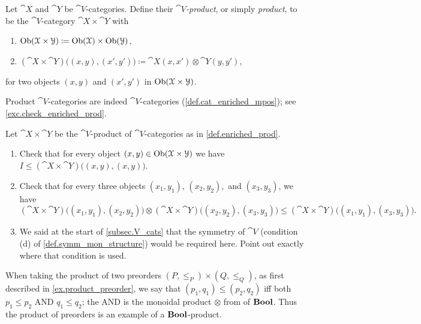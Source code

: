 \documentclass[7Sketches]{subfiles}
\begin{document}
\begin{definition}%
\label{def.enriched_prod}%
Let $\cat{X}$ and $\cat{Y}$ be $\cat{V}$-categories. Define their \emph{$\cat{V}$-product}, or simply \emph{product}, to be the $\cat{V}$-category $\cat{X}\times\cat{Y}$ with
\begin{enumerate}[label=(\roman*)]
	\item $\operatorname{Ob}(\mathcal{X}\times\mathcal{Y})\coloneqq\operatorname{Ob}(\mathcal{X})\times\operatorname{Ob}(\mathcal{Y})$,
	\item $(\cat{X}\times\cat{Y})\big((x,y),(x',y')\big)\coloneqq\cat{X}(x,x')\otimes\cat{Y}(y,y')$,
\end{enumerate}
for two objects $(x,y)$ and $(x',y')$ in $\operatorname{Ob}(\mathcal{X}\times\mathcal{Y})$. 
\end{definition}
Product $\cat{V}$-categories are indeed $\cat{V}$-categories
(\cref{def.cat_enriched_mpos}); see \cref{exc.check_enriched_prod}.

\begin{exercise}%
\label{exc.check_enriched_prod}
Let $\cat{X}\times\cat{Y}$ be the $\cat{V}$-product of $\cat{V}$-categories as in \cref{def.enriched_prod}.
\begin{enumerate}
	\item Check that for every object $(x,y)\in\operatorname{Ob}(\mathcal{X}\times\mathcal{Y})$ we
	have $I\leq(\cat{X}\times\cat{Y})\big((x,y),(x,y)\big)$.
	\item Check that for every three objects $(x_1,y_1)$, $(x_2,y_2),$ and $(x_3,y_3)$, we have
	\[
		(\cat{X}\times\cat{Y})\big((x_1,y_1),(x_2,y_2)\big)
		\otimes(\cat{X}\times\cat{Y})\big((x_2,y_2),(x_3,y_3)\big)
		\leq
		(\cat{X}\times\cat{Y})\big((x_1,y_1),(x_3,y_3)\big).
	\]
	\item We said at the start of \cref{subsec.V_cats} that the symmetry of $\cat{V}$ (condition (d) of \cref{def.symm_mon_structure}) would be required here. Point out exactly where that condition is used.%
	\qedhere
\end{enumerate}
\end{exercise}


When taking the product of two preorders $(P,\leq_P)\times(Q,\leq_Q)$, as first described in \cref{ex.product_preorder}, we say that $(p_1,q_1)\leq (p_2,q_2)$ iff both $p_1\leq p_2$ AND $q_1\leq q_2$; the AND is the monoidal product $\otimes$ from of $\mathbf{Bool}$. Thus the product of preorders is an example of a $\mathbf{Bool}$-product.
\end{document}
